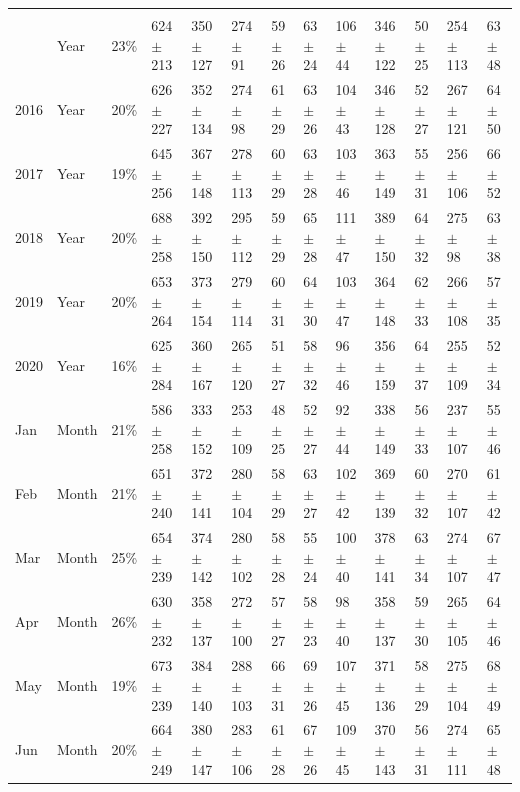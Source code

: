 \begin{longtable}[t]{lllllllllllll}
\endfoot
\bottomrule
\multicolumn{13}{l}{\rule{0pt}{1em}\textit{(continued on next page)}}\\
\endlastfoot
2015 & Year & 23\% & 624 $\pm$ 213 & 350 $\pm$ 127 & 274 $\pm$ 91 & 59 $\pm$ 26 & 63 $\pm$ 24 & 106 $\pm$ 44 & 346 $\pm$ 122 & 50 $\pm$ 25 & 254 $\pm$ 113 & 63 $\pm$ 48\\
2016 & Year & 20\% & 626 $\pm$ 227 & 352 $\pm$ 134 & 274 $\pm$ 98 & 61 $\pm$ 29 & 63 $\pm$ 26 & 104 $\pm$ 43 & 346 $\pm$ 128 & 52 $\pm$ 27 & 267 $\pm$ 121 & 64 $\pm$ 50\\
2017 & Year & 19\% & 645 $\pm$ 256 & 367 $\pm$ 148 & 278 $\pm$ 113 & 60 $\pm$ 29 & 63 $\pm$ 28 & 103 $\pm$ 46 & 363 $\pm$ 149 & 55 $\pm$ 31 & 256 $\pm$ 106 & 66 $\pm$ 52\\
2018 & Year & 20\% & 688 $\pm$ 258 & 392 $\pm$ 150 & 295 $\pm$ 112 & 59 $\pm$ 29 & 65 $\pm$ 28 & 111 $\pm$ 47 & 389 $\pm$ 150 & 64 $\pm$ 32 & 275 $\pm$ 98 & 63 $\pm$ 38\\
2019 & Year & 20\% & 653 $\pm$ 264 & 373 $\pm$ 154 & 279 $\pm$ 114 & 60 $\pm$ 31 & 64 $\pm$ 30 & 103 $\pm$ 47 & 364 $\pm$ 148 & 62 $\pm$ 33 & 266 $\pm$ 108 & 57 $\pm$ 35\\
2020 & Year & 16\% & 625 $\pm$ 284 & 360 $\pm$ 167 & 265 $\pm$ 120 & 51 $\pm$ 27 & 58 $\pm$ 32 & 96 $\pm$ 46 & 356 $\pm$ 159 & 64 $\pm$ 37 & 255 $\pm$ 109 & 52 $\pm$ 34\\
Jan & Month & 21\% & 586 $\pm$ 258 & 333 $\pm$ 152 & 253 $\pm$ 109 & 48 $\pm$ 25 & 52 $\pm$ 27 & 92 $\pm$ 44 & 338 $\pm$ 149 & 56 $\pm$ 33 & 237 $\pm$ 107 & 55 $\pm$ 46\\
Feb & Month & 21\% & 651 $\pm$ 240 & 372 $\pm$ 141 & 280 $\pm$ 104 & 58 $\pm$ 29 & 63 $\pm$ 27 & 102 $\pm$ 42 & 369 $\pm$ 139 & 60 $\pm$ 32 & 270 $\pm$ 107 & 61 $\pm$ 42\\
Mar & Month & 25\% & 654 $\pm$ 239 & 374 $\pm$ 142 & 280 $\pm$ 102 & 58 $\pm$ 28 & 55 $\pm$ 24 & 100 $\pm$ 40 & 378 $\pm$ 141 & 63 $\pm$ 34 & 274 $\pm$ 107 & 67 $\pm$ 47\\
Apr & Month & 26\% & 630 $\pm$ 232 & 358 $\pm$ 137 & 272 $\pm$ 100 & 57 $\pm$ 27 & 58 $\pm$ 23 & 98 $\pm$ 40 & 358 $\pm$ 137 & 59 $\pm$ 30 & 265 $\pm$ 105 & 64 $\pm$ 46\\
May & Month & 19\% & 673 $\pm$ 239 & 384 $\pm$ 140 & 288 $\pm$ 103 & 66 $\pm$ 31 & 69 $\pm$ 26 & 107 $\pm$ 45 & 371 $\pm$ 136 & 58 $\pm$ 29 & 275 $\pm$ 104 & 68 $\pm$ 49\\
Jun & Month & 20\% & 664 $\pm$ 249 & 380 $\pm$ 147 & 283 $\pm$ 106 & 61 $\pm$ 28 & 67 $\pm$ 26 & 109 $\pm$ 45 & 370 $\pm$ 143 & 56 $\pm$ 31 & 274 $\pm$ 111 & 65 $\pm$ 48\\

\end{longtable}

